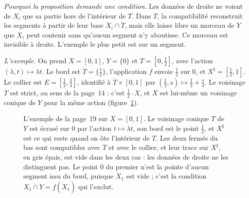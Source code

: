 \noindent\emph{Pourquoi la proposition demande une condition.} Les données de droite ne voient de $X_i$ que sa partie hors de l'intérieur de $T$. Dans $T$, la compatibilité reconstruit les segments à partir de leur base $X_i \cap \dot T$, mais elle laisse libre un morceau de $Y$ que $X_i$ peut contenir sans qu'aucun segment n'y aboutisse. Ce morceau est invisible à droite. L'exemple le plus petit est sur un segment.

\noindent\emph{L'exemple.} On prend $X = [0, 1]$, $Y = \{0\}$ et $T = [0, \frac12]$, avec l'action $(\lambda, t) \mapsto \lambda t$. Le bord est $\dot T = \{\frac12\}$, l'application $f$ envoie $\frac12$ sur $0$, et $X^\sharp = [\frac12, 1]$. Le collier est $E = [\frac12, \frac34]$, identifié à $\dot T \times [0, 1]$ par $(\frac12, s) \mapsto \frac12 + \frac s4$. Le voisinage $T$ est strict, au sens de la page~14 : c'est $\frac12 \cdot X$, et $X$ est lui-même un voisinage conique de $Y$ pour la même action (figure~\ref{fig:150-segment}).

\begin{figure}[htbp]
\centering
{}
\caption{L'exemple de la page~19 sur $X = [0, 1]$. Le voisinage conique $T$ de $Y$ est écrasé sur $0$ par l'action $t \mapsto \lambda t$, son bord est le point $\frac12$, et $X^\sharp$ est ce qui reste quand on ôte l'intérieur de $T$. Les deux fermés du bas sont compatibles avec $T$ et avec le collier, et leur trace sur $X^\sharp$, en gris épais, est vide dans les deux cas : les données de droite ne les distinguent pas. Le point $0$ du premier n'est la pointe d'aucun segment issu du bord, puisque $\dot X_1$ est vide ; c'est la condition $X_1 \cap Y = f(\dot X_1)$ qui l'exclut.}
\label{fig:150-segment}
\end{figure}

